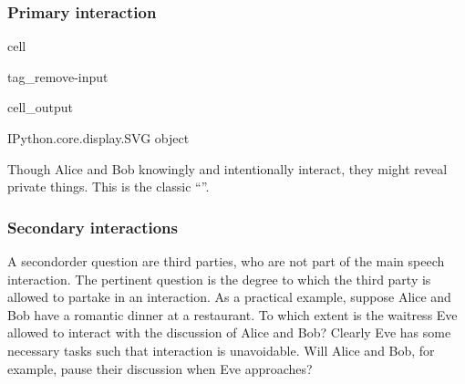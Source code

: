 \documentclass[letterpaper,10pt,english]{jupyterBook}
\begin{document}
\subsubsection{Primary interaction}
\label{\detokenize{Security_and_privacy:primary-interaction}}
\begin{sphinxuseclass}{cell}
\begin{sphinxuseclass}{tag_remove-input}\begin{sphinxVerbatimOutput}

\begin{sphinxuseclass}{cell_output}
\begin{sphinxVerbatim}[commandchars=\\\{\}]
\PYGZlt{}IPython.core.display.SVG object\PYGZgt{}
\end{sphinxVerbatim}

\end{sphinxuseclass}\end{sphinxVerbatimOutput}

\end{sphinxuseclass}
\end{sphinxuseclass}
\sphinxAtStartPar
Though Alice and Bob knowingly and intentionally interact, they might reveal private things. This is the classic “”.


\subsubsection{Secondary interactions}
\label{\detokenize{Security_and_privacy:secondary-interactions}}
\sphinxAtStartPar
A second\sphinxhyphen{}order question are third parties, who are not part of the main speech interaction. The pertinent question is the degree to which the third party is allowed to partake in an interaction. As a practical example, suppose Alice and Bob have a romantic dinner at a restaurant. To which extent is the waitress Eve allowed to interact with the discussion of Alice and Bob? Clearly Eve has some necessary tasks such that interaction is unavoidable. Will Alice and Bob, for example, pause their discussion when Eve approaches?
\end{document}
